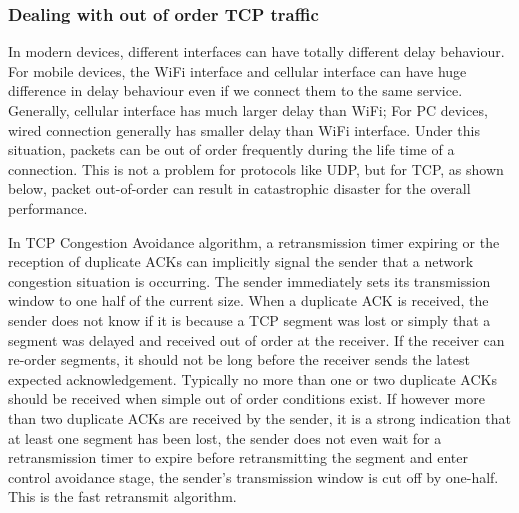 %


\subsubsection{Dealing with out of order TCP traffic}

In modern devices, different interfaces can have totally different delay behaviour. For mobile devices, the WiFi interface and cellular interface can have huge difference in delay behaviour even if we connect them to the same service. Generally, cellular interface has much larger delay than WiFi; For PC devices, wired connection generally has smaller delay than WiFi interface. Under this situation, packets can be out of order frequently during the life time of a connection. This is not a problem for protocols like UDP, but for TCP, as shown below, packet out-of-order can result in catastrophic disaster for the overall performance.

In TCP Congestion Avoidance algorithm, a retransmission timer expiring or the reception of duplicate ACKs can implicitly signal the sender that a network congestion situation is occurring. The sender immediately sets its transmission window to one half of the current size. When a duplicate ACK is received, the sender does not know if it is because a TCP segment was lost or simply that a segment was delayed and received out of order at the receiver. If the receiver can re-order segments, it should not be long before the receiver sends the latest expected acknowledgement. Typically no more than one or two duplicate ACKs should be received when simple out of order conditions exist. If however more than two duplicate ACKs are received by the sender, it is a strong indication that at least one segment has been lost, the sender does not even wait for a retransmission timer to expire before retransmitting the segment and enter control avoidance stage, the sender\textquoteright s transmission window is cut off by one-half. This is the fast retransmit algorithm.


